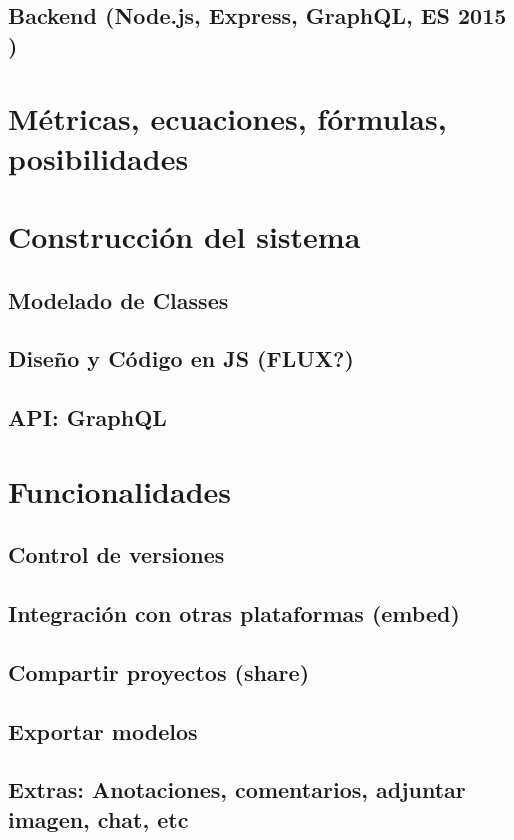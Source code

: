 \subsection{Backend (Node.js, Express, GraphQL, ES 2015 )}


\section{Métricas, ecuaciones, fórmulas, posibilidades}


\section{Construcción del sistema}

\subsection{Modelado de Classes}

\subsection{Diseño y Código en JS (FLUX?)}

\subsection{API: GraphQL}


\section{Funcionalidades}

\subsection{Control de versiones}

\subsection{Integración con otras plataformas (embed)}

\subsection{Compartir proyectos (share)}

\subsection{Exportar modelos}

\subsection{Extras: Anotaciones, comentarios, adjuntar imagen, chat, etc}
